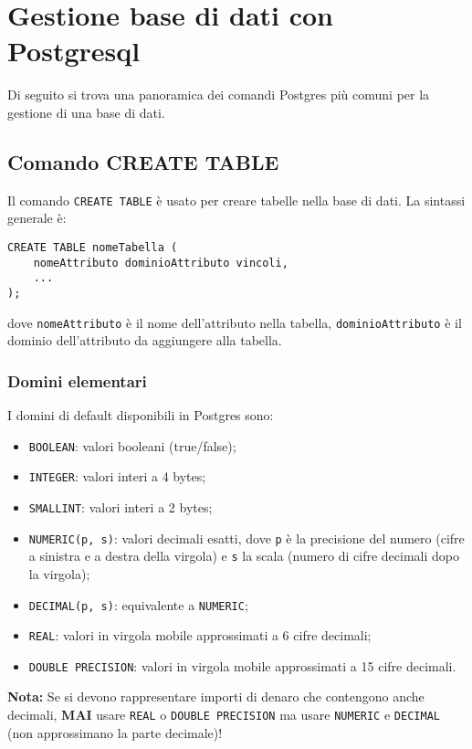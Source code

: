 \documentclass[a4paper, 10pt, titlepage]{article}
\begin{document}
	\begin{frontespizio}
		\Preambolo{\usepackage{datetime}}
	\end{frontespizio}

	\tableofcontents
		
	\newpage
	
	\section{Gestione base di dati con Postgresql}
	Di seguito si trova una panoramica dei comandi Postgres più comuni per la gestione di una base di dati.
	
	\subsection{Comando CREATE TABLE}
	Il comando \lstinline{CREATE TABLE} è usato per creare tabelle nella base di dati.
	La sintassi generale è:
	\begin{lstlisting}
CREATE TABLE nomeTabella (
	nomeAttributo dominioAttributo vincoli,
	...
);
	\end{lstlisting}
	dove \lstinline|nomeAttributo| è il nome dell'attributo nella tabella, \lstinline|dominioAttributo| è il dominio dell'attributo da aggiungere alla tabella.
	
	\subsubsection{Domini elementari}
	I domini di default disponibili in Postgres sono:
	\begin{itemize}
		\item \lstinline|BOOLEAN|: valori booleani (true/false);
		\item \lstinline|INTEGER|: valori interi a 4 bytes;
		\item \lstinline|SMALLINT|: valori interi a 2 bytes;
		\item \lstinline|NUMERIC(p, s)|: valori decimali esatti, dove \lstinline|p| è la precisione del numero (cifre a sinistra e a destra della virgola) e \lstinline|s| la scala (numero di cifre decimali dopo la virgola);
		\item \lstinline|DECIMAL(p, s)|: equivalente a \lstinline|NUMERIC|;
		\item \lstinline|REAL|: valori in virgola mobile approssimati a 6 cifre decimali;
		\item \lstinline|DOUBLE PRECISION|: valori in virgola mobile approssimati a 15 cifre decimali.
	\end{itemize}
	\textbf{Nota:} Se si devono rappresentare importi di denaro che contengono anche
	decimali, \textbf{MAI} usare \lstinline|REAL| o \lstinline|DOUBLE PRECISION| ma usare \lstinline|NUMERIC| e \lstinline|DECIMAL| (non approssimano la parte decimale)!
\end{document}
